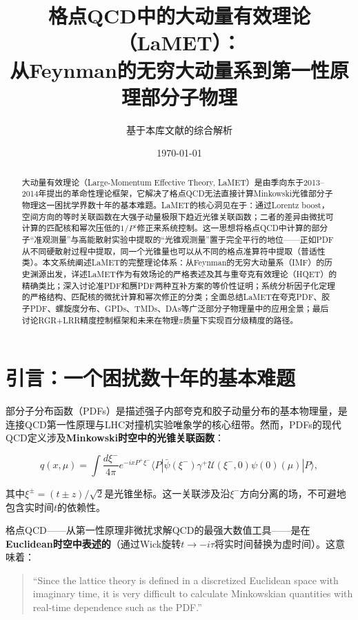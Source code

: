 \documentclass[12pt,a4paper]{ctexart}
\title{\heiti 格点QCD中的大动量有效理论（LaMET）：\\
从Feynman的无穷大动量系到第一性原理部分子物理}
\author{基于本库文献的综合解析}
\date{\today}
\theoremstyle{definition}
\begin{document}
\maketitle

\begin{abstract}
\noindent
大动量有效理论（Large-Momentum Effective Theory, LaMET）是由季向东于2013--2014年提出的革命性理论框架，它解决了格点QCD无法直接计算Minkowski光锥部分子物理这一困扰学界数十年的基本难题。LaMET的核心洞见在于：通过Lorentz boost，空间方向的等时关联函数在大强子动量极限下趋近光锥关联函数；二者的差异由微扰可计算的匹配核和幂次压低的$1/P^z$修正来系统控制。这一思想将格点QCD中计算的部分子``准观测量''与高能散射实验中提取的``光锥观测量''置于完全平行的地位——正如PDF从不同硬散射过程中提取，同一个光锥量也可以从不同的格点准算符中提取（普适性类）。本文系统阐述LaMET的完整理论体系：从Feynman的无穷大动量系（IMF）的历史渊源出发，详述LaMET作为有效场论的严格表述及其与重夸克有效理论（HQET）的精确类比；深入讨论准PDF和赝PDF两种互补方案的等价性证明；系统分析因子化定理的严格结构、匹配核的微扰计算和幂次修正的分类；全面总结LaMET在夸克PDF、胶子PDF、螺旋度分布、GPDs、TMDs、DAs等广泛部分子物理量中的应用全景；最后讨论RGR+LRR精度控制框架和未来在物理$\pi$质量下实现百分级精度的路径。
\end{abstract}

\tableofcontents
\newpage

\section{引言：一个困扰数十年的基本难题}

部分子分布函数（PDFs）是描述强子内部夸克和胶子动量分布的基本物理量，是连接QCD第一性原理与LHC对撞机实验唯象学的核心纽带。然而，PDFs的现代QCD定义涉及\textbf{Minkowski时空中的光锥关联函数}\cite{Izubuchi2018,Zhang2019}：

\begin{equation}
q(x, \mu) = \int \frac{d\xi^-}{4\pi} e^{-ixP^+\xi^-} \langle P| \bar{\psi}(\xi^-) \gamma^+ \mathcal{U}(\xi^-, 0) \psi(0)(\mu) |P\rangle,
\end{equation}

其中$\xi^\pm = (t \pm z)/\sqrt{2}$是光锥坐标。这一关联涉及沿$\xi^-$方向分离的场，不可避地包含实时间$t$的依赖性。

格点QCD——从第一性原理非微扰求解QCD的最强大数值工具——是在\textbf{Euclidean时空中表述的}（通过Wick旋转$t \to -i\tau$将实时间替换为虚时间）。这意味着：

\begin{quote}
``Since the lattice theory is defined in a discretized Euclidean space with imaginary time, it is very difficult to calculate Minkowskian quantities with real-time dependence such as the PDF.''\cite{Izubuchi2018}
\end{quote}
\end{document}
